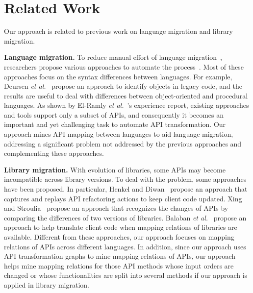 \section{Related Work}
\label{sec:related}

Our approach is related to previous work on
language migration and library migration.

\textbf{Language migration.} To reduce manual effort of language
migration~\cite{samet1981experience}, researchers propose various
approaches to automate the
process~\cite{hassan2005lightweight,van1999identifying,waters1988program,mossienko2003automated,yasumatsu1995spice}.
Most of these approaches focus on the syntax differences between
languages. For example, Deursen \emph{et
al.}~\cite{van1999identifying} propose an approach to identify
objects in legacy code, and the results are useful to deal with
differences between object-oriented and procedural languages. As
shown by El-Ramly \emph{et al.}~\cite{el2006experiment}'s experience
report, existing approaches and tools support only a subset of APIs,
and consequently it becomes an important and yet challenging task to
automate API transformation. Our approach mines API mapping between
languages to aid language migration, addressing a significant
problem not addressed by the previous approaches and complementing
these approaches.

\textbf{Library migration.} With evolution of libraries, some APIs
may become incompatible across library versions. To deal with the
problem, some approaches have been proposed. In particular, Henkel
and Diwan~\cite{henkel2005catchup} propose an approach that captures
and replays API refactoring actions to keep client code updated.
Xing and Stroulia~\cite{xing2007api} propose an approach that
recognizes the changes of APIs by comparing the differences of two
versions of libraries. Balaban \emph{et
al.}~\cite{balaban2005refactoring} propose an approach to help
translate client code when mapping relations of libraries are
available. Different from these approaches, our approach focuses on
mapping relations of APIs across different languages. In addition, since
our approach uses API transformation graphs to mine mapping
relations of APIs, our approach helps mine mapping relations for
those API methods whose input orders are changed or whose
functionalities are split into several methods if our approach is
applied in library migration.
